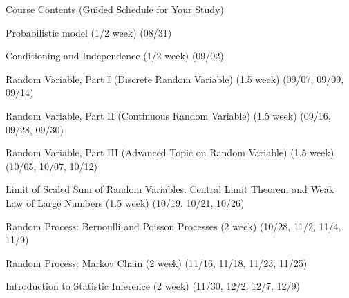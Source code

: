 \begin{frame}{Course Contents (Guided Schedule for Your Study)}

\plitemsep 0.02in


\small
\bce[1.] 

\item Probabilistic model (1/2 week) (08/31)

\item Conditioning and Independence (1/2 week) (09/02)

\item Random Variable, Part I (Discrete Random Variable) (1.5 week)
  (09/07, 09/09, 09/14)

\item[]  \hrulefill

\item Random Variable, Part II (Continuous Random Variable) (1.5 week)
  (09/16, 09/28, 09/30) 

\item Random Variable, Part III (Advanced Topic on Random Variable)
  (1.5 week) (10/05, 10/07, 10/12)

\item[]  \hrulefill

\item Limit of Scaled Sum of Random Variables: Central Limit Theorem
  and Weak Law of Large Numbers (1.5 week) (10/19, 10/21, 10/26)

\item Random Process: Bernoulli and Poisson Processes (2 week) (10/28,
  11/2, 11/4, 11/9)

\item[]  \hrulefill

\item Random Process: Markov Chain (2 week) (11/16, 11/18, 11/23, 11/25)

\item Introduction to Statistic Inference (2 week) (11/30, 12/2, 12/7,
  12/9)

\item[]  \hrulefill
  \ece

\end{frame}


